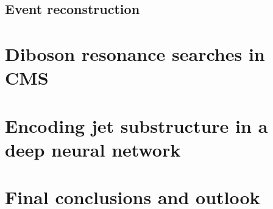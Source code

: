 \documentclass[12pt,USenglish,a4]{book} %
\begin{document}
\chapter{Event reconstruction} %
\label{ch:objreco}


\part{Diboson resonance searches in CMS}
\label{ch:diboson}


\part{Encoding jet substructure in a deep neural network}
\label{ch:lola}


\part{Final conclusions and outlook}	
\label{ch:summary}

\clearpage

\newpage\thispagestyle{empty}\mbox{}

\appendix
\label{app}
\vspace*{\fill}\newpage



\newpage





\end{document}
